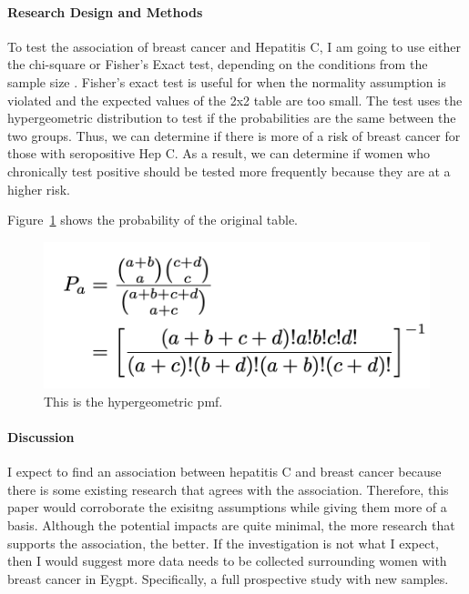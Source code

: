 \documentclass[12pt]{article}
\begin{document}
\paragraph{Research Design and Methods}
To test the association of breast cancer and Hepatitis C, I am going to use either the chi-square or Fisher's Exact test, depending on the
conditions from the sample size \citep{warner2013testing}. Fisher's exact test is useful for when the normality assumption is violated 
and the expected values of the 2x2 table are too small. The test uses the hypergeometric distribution to test if the probabilities are
the same between the two groups. Thus, we can determine if there is more of a risk of breast cancer for those with seropositive Hep C. As
 a result, we can determine if women who chronically test positive should be tested more frequently because they are at a higher risk. 
 
Figure~\ref{fig:formula} shows the probability of the original table.

\begin{figure}[tbp]
  \centering
  \includegraphics[width=\textwidth]{formula.png}
  \caption{This is the hypergeometric pmf.}
  \label{fig:formula}
\end{figure}


\paragraph{Discussion}
I expect to find an association between hepatitis C and breast cancer because there is some existing research that agrees with the association.
Therefore, this paper would corroborate the exisitng assumptions while giving them more of a basis. Although the potential impacts are quite 
minimal, the more research that supports the association, the better. If the investigation is not what I expect, then I would suggest more
data needs to be collected surrounding women with breast cancer in Eygpt. Specifically, a full prospective study with new samples. 
\end{document}
